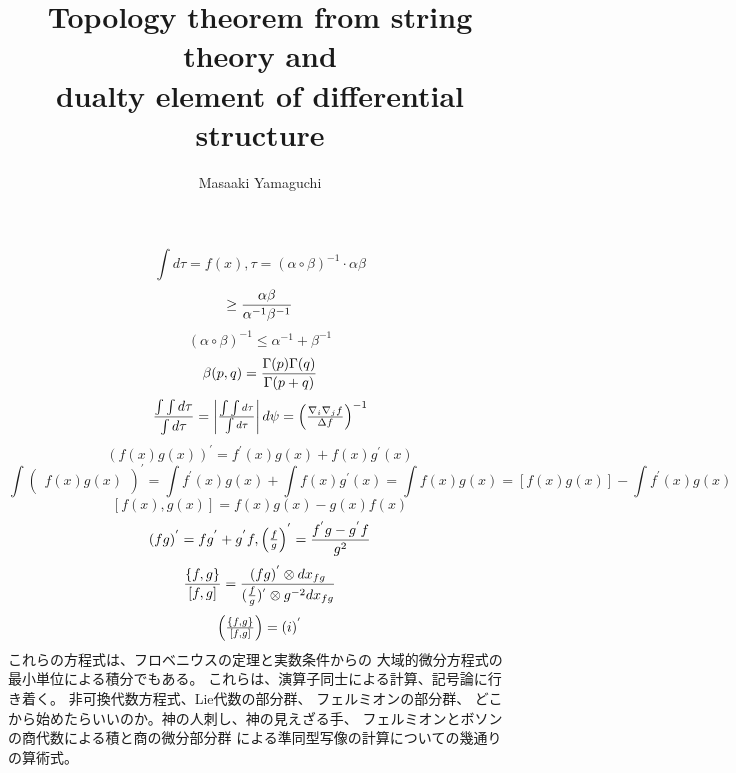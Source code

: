 \documentclass{jsarticle}
\begin{document}
\title{Topology theorem from string theory and \\
       dualty element of differential structure}
\author{Masaaki Yamaguchi}
\date{}
\maketitle


  $$ \int d \tau = f(x), \tau = (\alpha \circ \beta)^{-1}\cdot \alpha \beta $$
  $$ \ge {{\alpha \beta} \over {\alpha^{-1}\beta^{-1}}} $$
  $$ (\alpha \circ \beta)^{-1} \le \alpha^{-1} + \beta^{-1} $$
  $$ \beta(p,q) = {\Gamma(p) \Gamma(q) \over \Gamma(p+q)} $$
  $$ {{\int \int d \tau} \over {\int d \tau}} = \begin{vmatrix} {{\int \int d 
  \tau} \over {\int d \tau}} \end{vmatrix}d \psi = \begin{pmatrix} {{
  \nabla_i \nabla_j f} \over {\Delta f}} \end{pmatrix}^{-1} $$
  $$ (f(x)g(x))^{'} = f^{'}(x)g(x) + f(x)g^{'}(x) $$
  $$ \int {\begin{pmatrix} f(x)g(x) \end{pmatrix}}^{'} = 
	  \int f^{'}(x)g(x) + \int f(x) g^{'}(x) = 
	  \int f(x)g(x) = [f(x)g(x)] - \int f^{'}(x)g(x) $$
	  $$ [f(x),g(x)] = f(x)g(x) - g(x)f(x) $$
	  $$ (fg)^{'} = fg^{'} + g^{'}f, \begin{pmatrix}{f \over g}
	  \end{pmatrix}^{'} = {{f^{'}g - g^{'}f} \over {g^2}}$$
	  $$ {{\{f,g\}} \over {[f,g]}} = {{(fg)^{'}\otimes dx_{fg}}
	  \over {{({f \over g})^{'}} \otimes g^{-2}dx_{fg}}} $$
	  $$ \begin{pmatrix} {{\{f,g\}} \over {[f,g]}}\end{pmatrix} = (i)^{'} $$
	これらの方程式は、フロベニウスの定理と実数条件からの
		  大域的微分方程式の最小単位による積分でもある。
		  これらは、演算子同士による計算、記号論に行き着く。
		  非可換代数方程式、Lie代数の部分群、
		  フェルミオンの部分群、
		  どこから始めたらいいのか。神の人刺し、神の見えざる手、
		  フェルミオンとボソンの商代数による積と商の微分部分群
		  による準同型写像の計算についての幾通りの算術式。
		   
\end{document}
